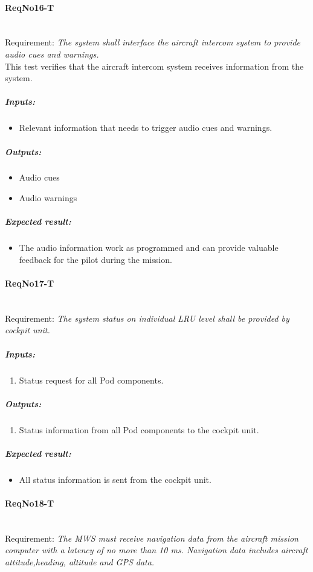 \paragraph{ReqNo16-T}\mbox{}\\ %
Requirement: \textit{The system shall interface the aircraft intercom system to provide audio cues and warnings.}
\\
This test verifies that the aircraft intercom system receives information from the system.
\\
	\subparagraph{Inputs:}
	\begin{itemize}
	\item Relevant information that needs to trigger audio cues and warnings.
	\end{itemize}
	\subparagraph{Outputs:}
	\begin{itemize}
	\item Audio cues
	\item Audio warnings
	\end{itemize}
	\subparagraph{Expected result:}
	\begin{itemize}
	\item The audio information work as programmed and can provide valuable
	feedback for the pilot during the mission.
	\end{itemize}


\paragraph{ReqNo17-T}\mbox{}\\ %
Requirement: \textit{The system status on individual LRU level shall be provided by cockpit unit.}\\

\subparagraph{Inputs:}
	\begin{enumerate}
	\item Status request for all Pod components.
	\end{enumerate}
\subparagraph{Outputs:}
	\begin{enumerate}
	\item Status information from all Pod components to the cockpit unit.
	\end{enumerate}
\subparagraph{Expected result:}
	\begin{itemize}
	\item All status information is sent from the cockpit unit.
	\end{itemize}


\paragraph{ReqNo18-T}\mbox{}\\ %
Requirement: \textit{The MWS must receive navigation data from the aircraft mission computer with a latency of no more than
10 ms. Navigation data includes aircraft attitude,heading, altitude and GPS data.}\\


